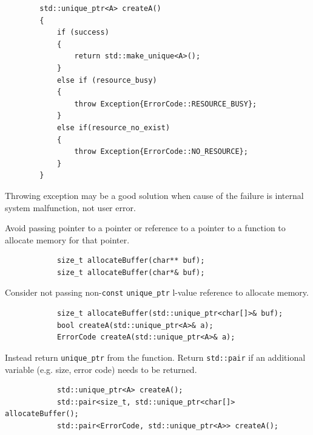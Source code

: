 \documentclass{beamer}
\begin{document}
\begin{frame}[fragile,t]
	\begin{lstlisting}
		std::unique_ptr<A> createA()
		{
			if (success)
			{
				return std::make_unique<A>();
			}
			else if (resource_busy)
			{
				throw Exception{ErrorCode::RESOURCE_BUSY};
			}
			else if(resource_no_exist)
			{
				throw Exception{ErrorCode::NO_RESOURCE};
			}
		}
	\end{lstlisting}
	
	Throwing exception may be a good solution when cause of the failure is internal system
	malfunction, not user error.

\end{frame}

\begin{frame}[fragile]
	Avoid passing pointer to a pointer or reference to a pointer to a function to allocate memory for that pointer.
	\begin{example}
		\begin{lstlisting}
			size_t allocateBuffer(char** buf);
			size_t allocateBuffer(char*& buf);
		\end{lstlisting}	
	\end{example}
\end{frame}

\begin{frame}[fragile]
	Consider not passing non-\texttt{const} \texttt{unique\_ptr} l-value reference to allocate memory.
	\begin{example}
		\begin{lstlisting}
			size_t allocateBuffer(std::unique_ptr<char[]>& buf);
			bool createA(std::unique_ptr<A>& a);
			ErrorCode createA(std::unique_ptr<A>& a);
		\end{lstlisting}	
	\end{example}
	Instead return \texttt{unique\_ptr} from the function. Return \texttt{std::pair} if an additional variable (e.g. size, error code) needs to be returned.
	\begin{example}
		\begin{lstlisting}
			std::unique_ptr<A> createA();
			std::pair<size_t, std::unique_ptr<char[]> allocateBuffer();
			std::pair<ErrorCode, std::unique_ptr<A>> createA();
		\end{lstlisting}	
	\end{example}
\end{frame}
\end{document}
